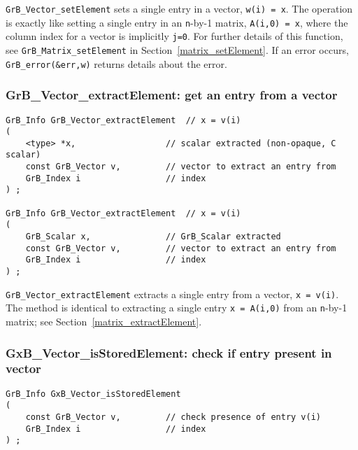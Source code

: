 \documentclass[12pt]{article}
\begin{document}
\verb'GrB_Vector_setElement' sets a single entry in a vector, \verb'w(i) = x'.
The operation is exactly like setting a single entry in an \verb'n'-by-1
matrix, \verb'A(i,0) = x', where the column index for a vector is implicitly
\verb'j=0'.  For further details of this function, see
\verb'GrB_Matrix_setElement' in Section~\ref{matrix_setElement}.
If an error occurs, \verb'GrB_error(&err,w)' returns details about the error.

\subsubsection{{\sf GrB\_Vector\_extractElement:} get an entry from a vector}
\label{vector_extractElement}

\begin{mdframed}[userdefinedwidth=6in]
{\footnotesize
\begin{verbatim}
GrB_Info GrB_Vector_extractElement  // x = v(i)
(
    <type> *x,                  // scalar extracted (non-opaque, C scalar)
    const GrB_Vector v,         // vector to extract an entry from
    GrB_Index i                 // index
) ;

GrB_Info GrB_Vector_extractElement  // x = v(i)
(
    GrB_Scalar x,               // GrB_Scalar extracted
    const GrB_Vector v,         // vector to extract an entry from
    GrB_Index i                 // index
) ;
\end{verbatim} } \end{mdframed}

\verb'GrB_Vector_extractElement' extracts a single entry from a vector,
\verb'x = v(i)'.  The method is identical to extracting a single entry
\verb'x = A(i,0)' from an \verb'n'-by-1 matrix; see
Section~\ref{matrix_extractElement}.

\newpage
\subsubsection{{\sf GxB\_Vector\_isStoredElement:} check if entry present in vector}
\label{vector_isStoredElement}

\begin{mdframed}[userdefinedwidth=6in]
{\footnotesize
\begin{verbatim}
GrB_Info GxB_Vector_isStoredElement
(
    const GrB_Vector v,         // check presence of entry v(i)
    GrB_Index i                 // index
) ;
\end{verbatim} } \end{mdframed}
\end{document}

